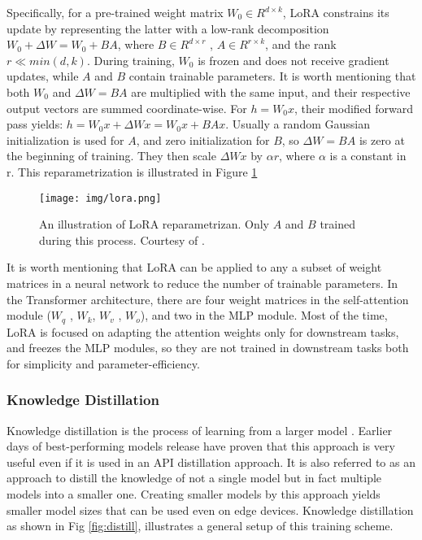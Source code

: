 \documentclass[conference]{IEEEtran}
\begin{document}
Specifically, for a pre-trained weight matrix $W_0 \in R^{d \times k}$, LoRA constrains its update by representing the latter with a low-rank decomposition $W_0 + \Delta W = W_0 + BA$, where $B \in R^{d \times r}$ , $A \in R^{r \times k}$, and the rank $r \ll min(d, k)$.
During training, $W_0$ is frozen and does not receive gradient updates, while $A$ and $B$ contain trainable parameters. 
It is worth mentioning that both $W_0$ and $\Delta W = BA$ are multiplied with the same input, and their respective
output vectors are summed coordinate-wise. For $h = W_0 x$, their modified forward pass yields:
$h = W_0 x + \Delta W x = W_0 x + BA x$.
Usually a random Gaussian initialization is used for $A$, and zero initialization for $B$, so $\Delta W = BA$ is zero at the beginning of training. 
They then scale $\Delta Wx$ by $\alpha r$, where $\alpha$ is a constant in r.
This reparametrization is illustrated in Figure \ref{fig:lora}
\begin{figure}
    \centering
    \texttt{[image: img/lora.png]}
    \caption{An illustration of LoRA reparametrizan. Only $A$ and $B$ trained during this process. Courtesy of \cite{hu2021lora}.}
    \label{fig:lora}
\end{figure}

It is worth mentioning that  LoRA can be applied to any a subset of weight matrices in a neural network to reduce the number of trainable parameters. 
In the Transformer architecture, there are four weight matrices in the self-attention module ($W_q$ , $W_k$, $W_v$ , $W_o$), and two in the MLP module. Most of the time, LoRA is focused on adapting the attention weights only for downstream tasks, and freezes the MLP modules,  so they are not trained in downstream tasks both for simplicity and parameter-efficiency.

\subsubsection{\textbf{Knowledge Distillation}}
Knowledge distillation is the process of learning from a larger model \cite{hinton2015distilling}. Earlier days of best-performing models release have proven that this approach is very useful even if it is used in an API distillation approach. It is also referred to as an approach to distill the knowledge of not a single model but in fact multiple models into a smaller one. Creating smaller models by this approach yields smaller model sizes that can be used even on edge devices. Knowledge distillation as shown in Fig \ref{fig:distill}, illustrates a general setup of this training scheme.
\end{document}
